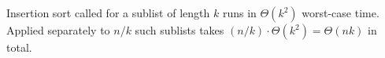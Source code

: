 Insertion sort called for a sublist of length $k$ runs in $\Theta(k^2)$ worst-case time.
Applied separately to $n/k$ such sublists takes $(n/k)\cdot\Theta(k^2)=\Theta(nk)$ in total.
